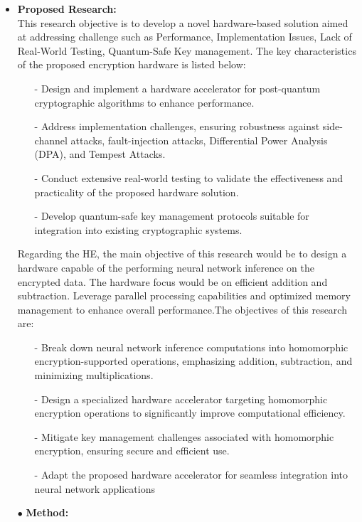 \begin {itemize}
 \item [$\bullet$] { \bf Proposed Research:} \vspace{0.5em} \\
This research objective is to develop a novel hardware-based solution aimed at addressing  challenge such as Performance, Implementation Issues, Lack of Real-World Testing, Quantum-Safe Key management. The key characteristics of the proposed encryption hardware is listed below:
\begin{itemize}
   \item[-]   Design and implement a hardware accelerator for post-quantum cryptographic algorithms to enhance performance.
   \item[-]   Address implementation challenges, ensuring robustness against side-channel attacks, fault-injection attacks, Differential Power Analysis (DPA), and Tempest Attacks.
  \item[-]    Conduct extensive real-world testing to validate the effectiveness and practicality of the proposed hardware solution.
  \item[-]    Develop quantum-safe key management protocols suitable for integration into existing cryptographic systems.
\end {itemize}
Regarding the HE, the main objective of this research would be to design a hardware capable of the performing neural network inference on the encrypted data. The hardware focus would be on efficient addition and subtraction. Leverage parallel processing capabilities and optimized memory management to enhance overall performance.The objectives of this research are:
    \begin{itemize}
    \item[-]    Break down neural network inference computations into homomorphic encryption-supported operations, emphasizing addition, subtraction, and minimizing multiplications.
  \item[-]   Design a specialized hardware accelerator targeting homomorphic encryption operations to significantly improve computational efficiency.
  \item[-]   Mitigate key management challenges associated with homomorphic encryption, ensuring secure and efficient use.
  \item[-]   Adapt the proposed hardware accelerator for seamless integration into neural network applications
    \end{itemize}
 \item [$\bullet$] { \bf Method:} \vspace{0.5em} \\

\end{itemize}
